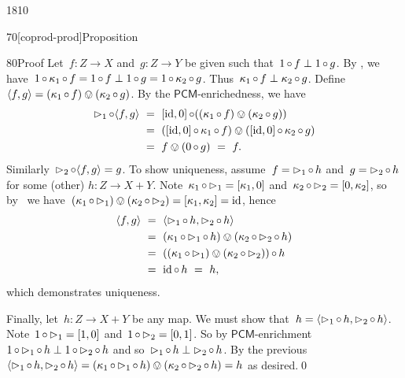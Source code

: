 \begin{parsec}{1810}
\begin{point}{70}[coprod-prod]{Proposition}
\begin{point}{80}{Proof}
Let~$f\colon Z \to X$ and~$g\colon Z \to Y$ be given
        such that~$1\mathop{\circ} f \perp 1\mathop{\circ} g$.
By ,
we have~$1 \mathop{\circ} \kappa_1 \mathop{\circ} f = 1 \mathop{\circ} f \perp 1 \mathop{\circ} g =
        1 \mathop{\circ} \kappa_2 \mathop{\circ} g$.
Thus~$\kappa_1 \mathop{\circ} f \perp \kappa_2 \mathop{\circ} g$.
Define~$\langle f, g\rangle = (\kappa_1 \mathop{\circ} f) \ovee (\kappa_2 \mathop{\circ} g)$.
    By the $\mathsf{PCM}$-enrichedness, we have
\begin{align*}
\mathord{\vartriangleright}_1 \mathop{\circ} \langle f, g\rangle 
&\  =\  [\operatorname{id}, 0] \mathop{\circ} ((\kappa_1 \mathop{\circ} f) \ovee (\kappa_2 \mathop{\circ} g)) \\
 &\  =\  ([\operatorname{id}, 0] \mathop{\circ} \kappa_1 \mathop{\circ} f) \ovee 
    ([\operatorname{id}, 0] \mathop{\circ} \kappa_2 \mathop{\circ} g) \\
    & \ =\  f \ovee (0 \mathop{\circ} g) \ = \ f.
\end{align*}
Similarly~$\mathord{\vartriangleright}_2 \mathop{\circ} \langle f, g \rangle = g$.
To show uniqueness, assume~$f = \mathord{\vartriangleright}_1 \mathop{\circ} h$
    and~$g = \mathord{\vartriangleright}_2 \mathop{\circ} h$ for some (other)
    $h\colon Z \to X+Y$.
Note~$\kappa_1 \mathop{\circ} \mathord{\vartriangleright}_1 = [\kappa_1, 0]$
and~$\kappa_2 \mathop{\circ} \mathord{\vartriangleright}_2 = [0, \kappa_2]$,
so by~ we have~$(\kappa_1 \mathop{\circ} \mathord{\vartriangleright}_1)
    \ovee (\kappa_2 \mathop{\circ} \mathord{\vartriangleright}_2) = [\kappa_1, \kappa_2] = \operatorname{id}$,
    hence
\begin{align*}
    \langle f, g\rangle & \ = \ 
    \langle \pproj_1 \after h, \pproj_2 \after h \rangle \\
    & \ = \ (\kappa_1 \after\pproj_1 \after h) 
    \ovee (\kappa_2 \after\pproj_2 \after h)  \\
    & \ = \ ((\kappa_1 \after\pproj_1 )
    \ovee (\kappa_2 \after\pproj_2 ))  \after h \\
    & \ = \   \id \after h \ = \  h,
\end{align*}
which demonstrates uniqueness.

Finally, let~$h\colon Z\to X+Y$ be any map.
We must show that~$h = \langle \mathord{\vartriangleright}_1 \mathop{\circ} h, \mathord{\vartriangleright}_2 \mathop{\circ} h\rangle$.
Note~$1 \mathop{\circ} \mathord{\vartriangleright}_1 = [1,0]$
    and~$1 \mathop{\circ} \mathord{\vartriangleright}_2 = [0,1]$.
    So by $\mathsf{PCM}$-enrichment~$1 \mathop{\circ} \mathord{\vartriangleright}_1 \mathop{\circ} h \perp 1 \mathop{\circ} \mathord{\vartriangleright}_2 \mathop{\circ} h$ and so~$\mathord{\vartriangleright}_1 \mathop{\circ} h \perp \mathord{\vartriangleright}_2 \mathop{\circ} h$.
By the previous
$\langle \mathord{\vartriangleright}_1 \mathop{\circ} h, \mathord{\vartriangleright}_2 \mathop{\circ} h\rangle
= (\kappa_1 \mathop{\circ} \mathord{\vartriangleright}_1 \mathop{\circ} h) \ovee
 (\kappa_2 \mathop{\circ} \mathord{\vartriangleright}_2 \mathop{\circ} h) 
 = h $ as desired.\qed
\end{point}
\end{point}


\end{parsec}

